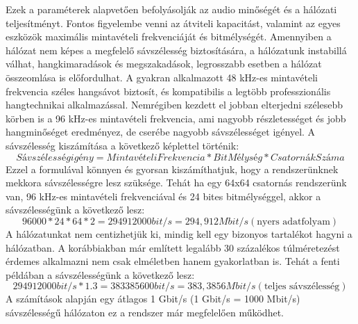 Ezek a paraméterek alapvetően befolyásolják az audio minőségét és a hálózati teljesítményt.
Fontos figyelembe venni az átviteli kapacitást, valamint az egyes eszközök maximális mintavételi frekvenciáját és bitmélységét.
Amennyiben a hálózat nem képes a megfelelő sávszélesség biztosítására, a hálózatunk instabillá válhat, 
hangkimaradások és megszakadások, legrosszabb esetben a hálózat összeomlása is előfordulhat.
A gyakran alkalmazott 48 kHz-es mintavételi frekvencia széles hangsávot biztosít, és kompatibilis a legtöbb
professzionális hangtechnikai alkalmazással. 
Nemrégiben kezdett el jobban elterjedni szélesebb körben is a 96 kHz-es mintavételi frekvencia, ami
nagyobb részletességet és jobb hangminőséget eredményez, de cserébe nagyobb sávszélességet igényel.
A sávszélesség kiszámítása a következő képlettel történik:
\begin{equation}
	\label{eq:sávszélesség}
	Sávszélesség igény = MintavételiFrekvencia * BitMélység * CsatornákSzáma
\end{equation}
Ezzel a formulával könnyen és gyorsan kiszámíthatjuk, hogy a rendszerünknek mekkora sávszélességre lesz szüksége.
Tehát ha egy 64x64 csatornás rendszerünk van, 96 kHz-es mintavételi frekvenciával és 24 bites bitmélységgel,
akkor a sávszélességünk a következő lesz:
\begin{equation}
	\label{eq:sávszélesség}
	96000 * 24 * 64 * 2 = 294912000 bit/s = 294,912 Mbit/s (\text{nyers adatfolyam})
\end{equation}
A hálózatunkat nem centizhetjük ki, mindig kell egy bizonyos tartalékot hagyni a hálózatban. A korábbiakban már említett
legalább 30 százalékos túlméretezést érdemes alkalmazni nem csak elméletben hanem gyakorlatban is. 
Tehát a fenti példában a sávszélességünk a következő lesz:
\begin{equation}
	\label{eq:teljes-sávszélesség}
	294912000 bit/s * 1.3 = 383385600 bit/s = 383,3856 Mbit/s (\text{teljes sávszélesség})
\end{equation}
A számítások alapján egy átlagos 1 Gbit/s (1 Gbit/s = 1000 Mbit/s) sávszélességű hálózaton ez a rendszer már megfelelően működhet.

